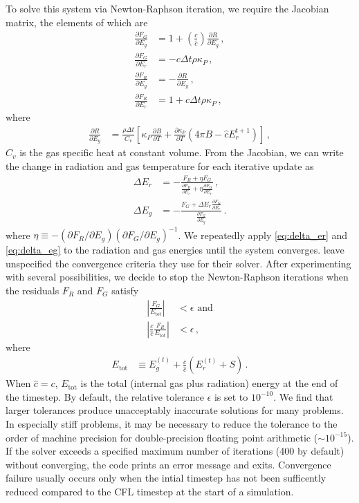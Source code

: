 \documentclass[fleqn,usenatbib]{mnras}
\begin{document}
To solve this system via Newton-Raphson iteration, we require the Jacobian matrix, the elements of which are
\begin{align}
\frac{\partial F_G}{\partial E_g} &= 1 + \left( \frac{c}{\hat c} \right) \frac{\partial R}{\partial E_g} \, , \\
\frac{\partial F_G}{\partial E_r} &= -c \Delta t \rho \kappa_P \, , \\
\frac{\partial F_R}{\partial E_g} &= -\frac{\partial R}{\partial E_g} \, , \\
\frac{\partial F_R}{\partial E_r} &= 1 + \hat c \Delta t \rho \kappa_P \, ,
\end{align}
where
\begin{align}
\frac{\partial R}{\partial E_g} &= \frac{\rho \Delta t}{C_v} \left[ \kappa_P \frac{\partial B}{\partial T} + \frac{\partial \kappa_P}{\partial T} \left( 4\pi B - \hat c E_r^{t+1} \right) \right] \, ,
\end{align}
$C_v$ is the gas specific heat at constant volume. From the Jacobian, we can write the change in radiation and gas temperature for each iterative update as
\begin{align}
\label{eq:delta_er}
\Delta E_r &= -\frac{F_R + \eta F_G}{ \frac{\partial F_R}{\partial E_r} + \eta \frac{\partial F_G}{\partial E_r} } \, , \\ 
\label{eq:delta_eg}
\Delta E_g &= -\frac{F_G + \Delta E_r \frac{\partial F_G}{\partial E_r}}{ \frac{\partial F_G}{\partial E_g} } \, .
\end{align}
where $\eta \equiv - (\partial F_R/\partial E_g) ( \partial F_G/\partial E_g )^{-1}$. We repeatedly apply \autoref{eq:delta_er} and \autoref{eq:delta_eg} to the radiation and gas energies until the system converges. \citet{Howell_2003} leave unspecified the convergence criteria they use for their solver. After experimenting with several possibilities, we decide to stop the Newton-Raphson iterations when the residuals $F_R$ and $F_G$ satisfy
\begin{align}
\left| \frac{F_G}{E_{\text{tot}}} \right| &< \epsilon \, \, \text{and} \\
\left| \frac{c}{\hat c} \frac{F_R}{E_{\text{tot}}} \right| &< \epsilon \, ,
\end{align}
where
\begin{align}
E_{\text{tot}} &\equiv E_g^{(t)} + \frac{c}{\hat c} \left( E_r^{(t)} + S \right) \, .
\end{align}
When $\hat c = c$, $E_{\text{tot}}$ is the total (internal gas plus radiation) energy at the end of the timestep. By default, the relative tolerance $\epsilon$ is set to $10^{-10}$. We find that larger tolerances produce unacceptably inaccurate solutions for many problems. In especially stiff problems, it may be necessary to reduce the tolerance to the order of machine precision for double-precision floating point arithmetic ($\sim 10^{-15}$). If the solver exceeds a specified maximum number of iterations (400 by default) without converging, the code prints an error message and exits. Convergence failure usually occurs only when the intial timestep has not been sufficently reduced compared to the CFL timestep at the start of a simulation.
\end{document}

